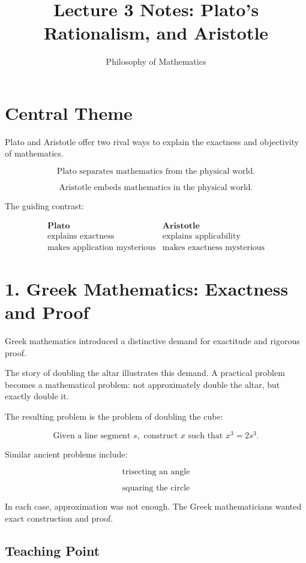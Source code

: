 \documentclass[11pt]{article}
\title{Lecture 3 Notes: Plato's Rationalism, and Aristotle}
\author{Philosophy of Mathematics}
\date{}
\begin{document}
\maketitle

\section*{Central Theme}

Plato and Aristotle offer two rival ways to explain the exactness and objectivity of
mathematics.

\[
\boxed{
\text{Plato separates mathematics from the physical world.}
}
\]

\[
\boxed{
\text{Aristotle embeds mathematics in the physical world.}
}
\]

The guiding contrast:

\[
\begin{array}{c|c}
\textbf{Plato} & \textbf{Aristotle} \\
\hline
\text{explains exactness} & \text{explains applicability} \\
\text{makes application mysterious} & \text{makes exactness mysterious}
\end{array}
\]

\section*{1. Greek Mathematics: Exactness and Proof}

Greek mathematics introduced a distinctive demand for exactitude and rigorous proof.

The story of doubling the altar illustrates this demand. A practical problem becomes a
mathematical problem: not approximately double the altar, but exactly double it.

The resulting problem is the problem of doubling the cube:

\[
\text{Given a line segment } s,\text{ construct } x \text{ such that } x^3 = 2s^3.
\]

Similar ancient problems include:

\[
\text{trisecting an angle}
\]

\[
\text{squaring the circle}
\]

In each case, approximation was not enough. The Greek mathematicians wanted exact
construction and proof.

\subsection*{Teaching Point}
\end{document}
